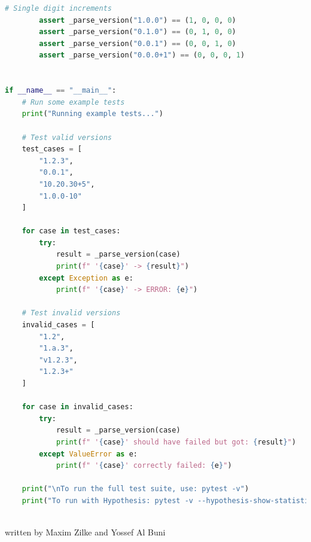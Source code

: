 \documentclass[a4paper]{scrreprt}
\begin{document}
\begin{aiTask}
\begin{answer}
\begin{lstlisting}[language=Python]
        # Single digit increments
        assert _parse_version("1.0.0") == (1, 0, 0, 0)
        assert _parse_version("0.1.0") == (0, 1, 0, 0)
        assert _parse_version("0.0.1") == (0, 0, 1, 0)
        assert _parse_version("0.0.0+1") == (0, 0, 0, 1)


if __name__ == "__main__":
    # Run some example tests
    print("Running example tests...")
    
    # Test valid versions
    test_cases = [
        "1.2.3",
        "0.0.1", 
        "10.20.30+5",
        "1.0.0-10"
    ]
    
    for case in test_cases:
        try:
            result = _parse_version(case)
            print(f" '{case}' -> {result}")
        except Exception as e:
            print(f" '{case}' -> ERROR: {e}")
    
    # Test invalid versions
    invalid_cases = [
        "1.2",
        "1.a.3", 
        "v1.2.3",
        "1.2.3+"
    ]
    
    for case in invalid_cases:
        try:
            result = _parse_version(case)
            print(f" '{case}' should have failed but got: {result}")
        except ValueError as e:
            print(f" '{case}' correctly failed: {e}")
    
    print("\nTo run the full test suite, use: pytest -v")
    print("To run with Hypothesis: pytest -v --hypothesis-show-statistics")



\end{lstlisting}

    written by Maxim Zilke and Yossef Al Buni
  \end{answer}
\end{aiTask}
\end{document}
